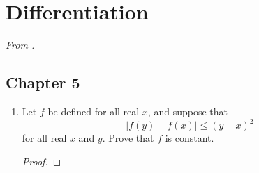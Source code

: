 \documentclass[../psets.tex]{subfiles}
\begin{document}
\section{Differentiation}
\emph{From \textcite{bib:Rudin}.}
\subsection*{Chapter 5}
\begin{enumerate}[label={\textbf{\arabic*.}}]
    \item Let $f$ be defined for all real $x$, and suppose that
    \begin{equation*}
        |f(y)-f(x)| \leq (y-x)^2
    \end{equation*}
    for all real $x$ and $y$. Prove that $f$ is constant.
    \begin{proof}



\end{proof}
\end{enumerate}
\end{document}
